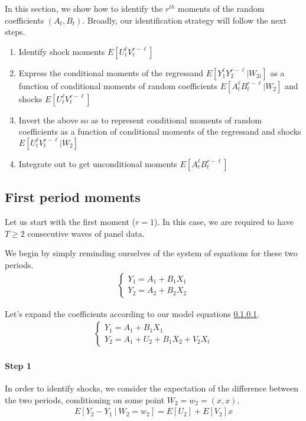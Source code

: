 In this section, we show how to identify the $r^{th}$ moments of the random coefficients $(A_{t}, B_{t})$. Broadly, our identification strategy will follow the next steps.

\begin{enumerate}
  \item Identify shock moments $E[U_{t}^{\ell}V_{t}^{r-\ell}]$ 
  
  \item Express the conditional moments of the regressand $E[Y_{1}^\ell Y_{2}^{r - \ell} | W_{2i}]$ as a function of conditional moments of random coefficients $E[A_{t}^{\ell}B_{t}^{r-\ell}|W_{2}]$ and shocks $E[U_{t}^{\ell}V_{t}^{r-\ell}]$ 
  
  \item Invert the above so as to represent conditional moments of random coefficients as a function of conditional moments of the regressand and shocks $E[U_{t}^{\ell}V_{t}^{r-\ell}|W_{2}]$ 
  
  \item Integrate out to get unconditional moments $E[A_{t}^{\ell}B_{t}^{r-\ell}]$
\end{enumerate}

\subsection{First period moments}

Let us start with the first moment ($r = 1$). In this case, we are required to have $T \geq 2$ consecutive waves of panel data. 


We begin by simply reminding ourselves of the system of equations for these two periods.
\begin{align}
  \begin{cases}
    Y_{1} = A_{1} + B_{1}X_{1} \\ 
    Y_{2} = A_{2} + B_{2}X_{2} 
  \end{cases}
\end{align}

Let's expand the coefficients according to our model equations \ref{}.
\begin{align}
  \begin{cases}
    Y_{1} = A_{1} + B_{1}X_{1} \\ 
    Y_{2} = A_{1} + U_{2} + B_{1}X_{2} + V_{2}X_{t} \label{eq:expanded}
  \end{cases}
\end{align}


\paragraph{Step 1} In order to identify shocks, we consider the expectation of the difference between the two periods, conditioning on some point $W_2 = w_2 = (x, x)$.
\begin{align}
  E[Y_{2} - Y_{1} \ | \  W_{2} = w_{2}] = 
  E[U_{2}] + E[V_{2}]x
\end{align}

